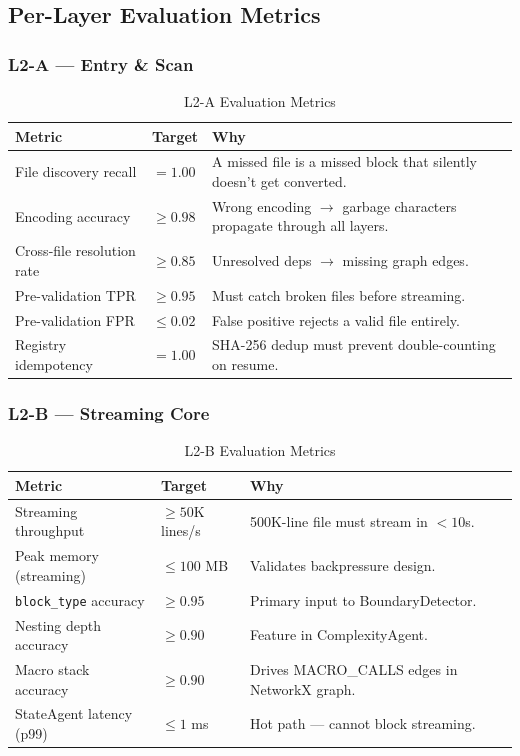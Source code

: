 \documentclass[11pt,a4paper]{article}
\begin{document}
\subsection{Per-Layer Evaluation Metrics}

\subsubsection{L2-A — Entry \& Scan}

\begin{table}[H]
\centering
\caption{L2-A Evaluation Metrics}
\renewcommand{\arraystretch}{1.25}
\small
\begin{tabularx}{\textwidth}{@{} L{3.5cm} l X @{}}
\toprule
\textbf{Metric} & \textbf{Target} & \textbf{Why} \\
\midrule
File discovery recall & $= 1.00$ & A missed file is a missed block that silently doesn't get converted. \\
Encoding accuracy & $\geq 0.98$ & Wrong encoding $\to$ garbage characters propagate through all layers. \\
Cross-file resolution rate & $\geq 0.85$ & Unresolved deps $\to$ missing graph edges. \\
Pre-validation TPR & $\geq 0.95$ & Must catch broken files before streaming. \\
Pre-validation FPR & $\leq 0.02$ & False positive rejects a valid file entirely. \\
Registry idempotency & $= 1.00$ & SHA-256 dedup must prevent double-counting on resume. \\
\bottomrule
\end{tabularx}
\end{table}

\subsubsection{L2-B — Streaming Core}

\begin{table}[H]
\centering
\caption{L2-B Evaluation Metrics}
\renewcommand{\arraystretch}{1.25}
\small
\begin{tabularx}{\textwidth}{@{} L{3.5cm} l X @{}}
\toprule
\textbf{Metric} & \textbf{Target} & \textbf{Why} \\
\midrule
Streaming throughput & $\geq 50$K lines/s & 500K-line file must stream in $< 10$s. \\
Peak memory (streaming) & $\leq 100$ MB & Validates backpressure design. \\
\texttt{block\_type} accuracy & $\geq 0.95$ & Primary input to BoundaryDetector. \\
Nesting depth accuracy & $\geq 0.90$ & Feature in ComplexityAgent. \\
Macro stack accuracy & $\geq 0.90$ & Drives MACRO\_CALLS edges in NetworkX graph. \\
StateAgent latency (p99) & $\leq 1$ ms & Hot path — cannot block streaming. \\
\bottomrule
\end{tabularx}
\end{table}
\end{document}
